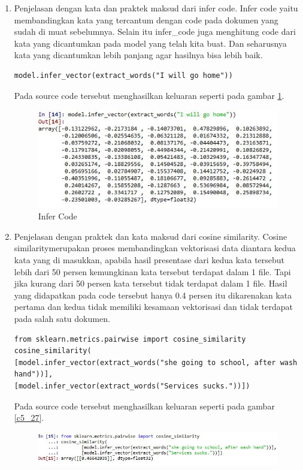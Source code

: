 \begin{enumerate}
\item Penjelasan dengan kata dan praktek maksud dari infer code.
\subitem Infer code yaitu membandingkan kata yang tercantum dengan code pada dokumen yang sudah di muat sebelumnya. Selain itu infer\_code juga menghitung code dari kata yang dicantumkan pada model yang telah kita buat. Dan seharusnya kata yang dicantumkan lebih panjang agar hasilnya bisa lebih baik.
\begin{verbatim}
model.infer_vector(extract_words("I will go home"))
\end{verbatim}
\subitem Pada source code tersebut menghasilkan keluaran seperti pada gambar \ref{c5_26}.
\begin{figure}[!htbp]
\centerline{\includegraphics[width=1\textwidth]{figures/c5p/26.JPG}}
\caption{Infer Code}
\label{c5_26}
\end{figure}
\item Penjelasan dengan praktek dan kata maksud dari cosine similarity.
\subitem Cosine similaritymerupakan proses membandingkan vektorisasi data diantara kedua kata yang di masukkan, apabila hasil presentase dari kedua kata tersebut lebih dari 50 persen kemungkinan kata tersebut terdapat dalam 1 file. Tapi jika kurang dari 50 persen kata tersebut tidak terdapat dalam 1 file. Hasil yang didapatkan pada code tersebut hanya 0.4 persen itu dikarenakan kata pertama dan kedua tidak memiliki kesamaan vektorisasi dan tidak terdapat pada salah satu dokumen.
\begin{verbatim}
from sklearn.metrics.pairwise import cosine_similarity
cosine_similarity(
[model.infer_vector(extract_words("she going to school, after wash hand"))],
[model.infer_vector(extract_words("Services sucks."))])
\end{verbatim}
\subitem Pada source code tersebut menghasilkan keluaran seperti pada gambar \ref{c5_27}.
\begin{figure}[!htbp]
\centerline{\includegraphics[width=1\textwidth]{figures/c5p/27.JPG}}

\end{figure}
\end{enumerate}
